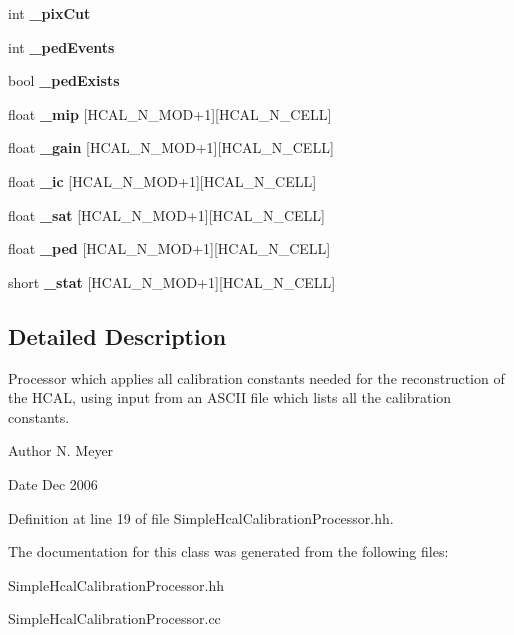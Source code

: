 \begin{DoxyCompactItemize}
\item 
int {\bfseries \_\-pixCut}\label{classCALICE_1_1SimpleHcalCalibrationProcessor_ac29276fe392b6ac72b23e0f730f1bfc9}

\item 
int {\bfseries \_\-pedEvents}\label{classCALICE_1_1SimpleHcalCalibrationProcessor_ae6637b017853d6d4e1491bd8298f57dc}

\item 
bool {\bfseries \_\-pedExists}\label{classCALICE_1_1SimpleHcalCalibrationProcessor_a41ee5ffb331bf97b272e04bfe99bb4ad}

\item 
float {\bfseries \_\-mip} [HCAL\_\-N\_\-MOD+1][HCAL\_\-N\_\-CELL]\label{classCALICE_1_1SimpleHcalCalibrationProcessor_a9e8d5e6713e6076c79867515faa8328a}

\item 
float {\bfseries \_\-gain} [HCAL\_\-N\_\-MOD+1][HCAL\_\-N\_\-CELL]\label{classCALICE_1_1SimpleHcalCalibrationProcessor_aa9c38f82b4ea253f1424a994f6dcd1ed}

\item 
float {\bfseries \_\-ic} [HCAL\_\-N\_\-MOD+1][HCAL\_\-N\_\-CELL]\label{classCALICE_1_1SimpleHcalCalibrationProcessor_aea9c5a1dbd09fa2ff84ed2b5c900742f}

\item 
float {\bfseries \_\-sat} [HCAL\_\-N\_\-MOD+1][HCAL\_\-N\_\-CELL]\label{classCALICE_1_1SimpleHcalCalibrationProcessor_a48ec62665670a867b702f61f8e195e94}

\item 
float {\bfseries \_\-ped} [HCAL\_\-N\_\-MOD+1][HCAL\_\-N\_\-CELL]\label{classCALICE_1_1SimpleHcalCalibrationProcessor_a89b5eaa92a71e02127908d83b4915691}

\item 
short {\bfseries \_\-stat} [HCAL\_\-N\_\-MOD+1][HCAL\_\-N\_\-CELL]\label{classCALICE_1_1SimpleHcalCalibrationProcessor_a98c972c3f3f4931498d94e2588dc8e09}

\end{DoxyCompactItemize}


\subsection{Detailed Description}
Processor which applies all calibration constants needed for the reconstruction of the HCAL, using input from an ASCII file which lists all the calibration constants. \begin{DoxyAuthor}{Author}
N. Meyer 
\end{DoxyAuthor}
\begin{DoxyDate}{Date}
Dec 2006 
\end{DoxyDate}


Definition at line 19 of file SimpleHcalCalibrationProcessor.hh.

The documentation for this class was generated from the following files:\begin{DoxyCompactItemize}
\item 
SimpleHcalCalibrationProcessor.hh\item 
SimpleHcalCalibrationProcessor.cc\end{DoxyCompactItemize}
